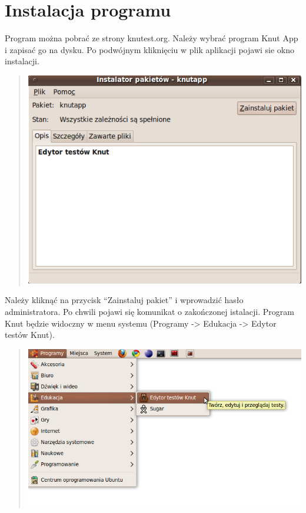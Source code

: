 \documentclass[letterpaper,10pt,polish]{sphinxmanual}
\begin{document}
\section{Instalacja programu}
\label{index:instalacja-programu}\label{index:id3}
Program można pobrać ze strony knutest.org. Należy wybrać program Knut App i zapisać go na dysku. Po podwójnym kliknięciu w plik aplikacji pojawi sie okno instalacji.
\begin{quote}

\includegraphics{Instalacja.png}
\end{quote}

Należy kliknąć na przycisk ``Zainstaluj pakiet'' i wprowadzić hasło administratora. Po chwili pojawi się komunikat o zakończonej istalacji. Program Knut będzie widoczny w menu systemu (Programy -\textgreater{} Edukacja -\textgreater{} Edytor testów Knut).
\begin{quote}

\includegraphics{MenuPoInstalacji.png}
\end{quote}
\end{document}
